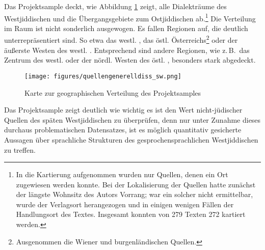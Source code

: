 Das Projektsample deckt, wie Abbildung \ref{kartegeo} zeigt, alle Dialekträume des Westjiddischen und die Übergangsgebiete zum Ostjiddischen ab.\footnote{\label{FNkarte} In die Kartierung aufgenommen wurden nur Quellen, denen ein Ort zugewiesen werden konnte. Bei der Lokalisierung der Quellen hatte zunächst der längste Wohnsitz des Autors Vorrang; war ein solcher nicht ermittelbar, wurde der Verlagsort herangezogen und in einigen wenigen Fällen der Handlungsort des Textes. Insgesamt konnten von 279 Texten 272 kartiert werden.} Die Verteilung im Raum ist nicht sonderlich ausgewogen. Es fallen Regionen auf, die deutlich unterrepräsentiert sind. So etwa das westl. \hai{{\NWJ}}, das östl. \hai{{\SWJ}} Österreichs\footnote{Ausgenommen die Wiener und burgenländischen Quellen.} oder der äußerste Westen des westl. \hai{{\ZWJ}}. Entsprechend sind andere Regionen, wie z.\,B.\, das Zentrum des westl. \hai{{\ZWJ}} oder der nördl. Westen des östl. \hai{{\NWJ}}, besonders stark abgedeckt.  


\begin{center}
\begin{figure}
\texttt{[image: figures/quellengenerelldiss\_sw.png]}
		\caption{\label{kartegeo}Karte zur geographischen Verteilung des Projektsamples}
		\end{figure}
		\end{center}



Das Projektsample zeigt deutlich wie wichtig es ist den Wert nicht-jüdischer Quellen des späten Westjiddischen zu überprüfen, denn nur unter Zunahme dieses durchaus problematischen Datensatzes, ist es möglich quantitativ gesicherte Aussagen über sprachliche Strukturen des gesprochensprachlichen Westjiddischen zu treffen.


